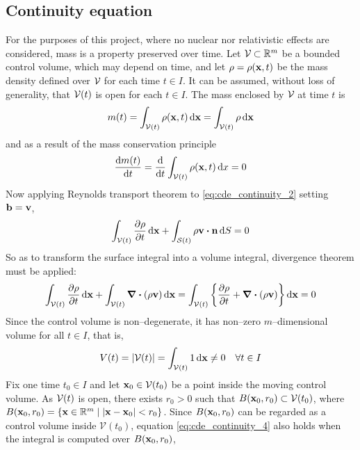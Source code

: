 
\subsection{Continuity equation}

For the purposes of this project, where no nuclear nor relativistic effects are considered, mass is a property preserved over time. Let $\mathcal{V}_{} \subset \mathbb{R}^m$ be a bounded control volume, which may depend on time, and let $\rho = \rho(\vb{x}, t)$ be the mass density defined over $\mathcal{V}_{}$ for each time $t \in I$. It can be assumed, without loss of generality, that ${\mathcal{V}(t)}$ is open for each $t \in I$. The mass enclosed by $\mathcal{V}_{}$ at time $t$ is
\begin{equation}
	m(t) = \int_{\mathcal{V}(t)} \rho(\vb{x}, t) \dd{\vb{x}} = \int_{\mathcal{V}(t)} \rho \dd{\vb{x}}
\end{equation}
and as a result of the mass conservation principle
\begin{equation} \label{eq:cde_continuity_2}
	\frac{\dd m(t)}{\dd{t}} = 
	\frac{\dd}{\dd{t}} \int_{\mathcal{V}(t)} \rho(\vb{x}, t) \dd{x} = 0
\end{equation}
Now applying Reynolds transport theorem to \eqref{eq:cde_continuity_2} setting $\vb{b} = \vb{v}$,
\begin{equation}
	\int_\cvt \frac{\partial \rho}{\partial t} \dd{\vb{x}} + 
	\int_\cst \rho \vb{v} \vdot \vb{n} \dd{S} = 0
\end{equation}
So as to transform the surface integral into a volume integral, divergence theorem must be applied:
\begin{equation} \label{eq:cde_continuity_4}
	\int_{\mathcal{V}(t)} \frac{\partial \rho}{\partial t} \dd{\vb{x}} + 
	\int_{\mathcal{V}(t)} \div(\rho \vb{v}) \dd{\vb{x}} = 
	\int_{\mathcal{V}(t)} \left\{ \frac{\partial \rho}{\partial t} + \div(\rho \vb{v}) \right\} \dd{\vb{x}} = 0
\end{equation}
Since the control volume is non--degenerate, it has non--zero $m$--dimensional volume for all $t \in I$, that is,
\begin{equation}
	V(t) = \abs{{\mathcal{V}(t)}} = \int_{\mathcal{V}(t)} 1 \dd{\vb{x}} \neq 0 \quad \forall t \in I
\end{equation}
Fix one time $t_0 \in I$ and let $\vb{x}_0 \in \mathcal{V}(t_0)$ be a point inside the moving control volume. As ${\mathcal{V}(t)}$ is open, there exists $r_0 > 0$ such that $B(\vb{x}_0, r_0) \subset \mathcal{V}(t_0)$, where $B(\vb{x}_0, r_0) = \{ \vb{x} \in \mathbb{R}^m \mid \abs{\vb{x} - \vb{x}_0} < r_0 \}$. Since $B(\vb{x}_0, r_0)$ can be regarded as a control volume inside $\mathcal{V}(t_0)$, equation \eqref{eq:cde_continuity_4} also holds when the integral is computed over $B(\vb{x}_0, r_0)$, \ie
